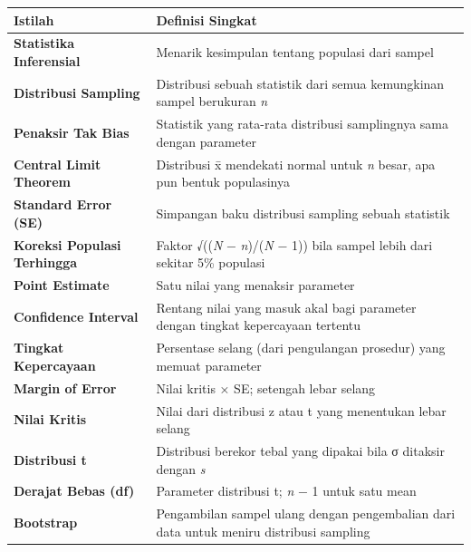 \documentclass[
  indonesian,
  letterpaper,
]{book}
\newcounter{none} %
\begin{document}
{\def\LTcaptype{none} %
\begin{longtable}[]{@{}
  >{\raggedright\arraybackslash}p{}
  >{\raggedright\arraybackslash}p{}@{}}
\toprule\noalign{}
\begin{minipage}[b]{\linewidth}\raggedright
Istilah
\end{minipage} & \begin{minipage}[b]{\linewidth}\raggedright
Definisi Singkat
\end{minipage} \\
\midrule\noalign{}
\endhead
\bottomrule\noalign{}
\endlastfoot
\textbf{Statistika Inferensial} & Menarik kesimpulan tentang populasi
dari sampel \\
\textbf{Distribusi Sampling} & Distribusi sebuah statistik dari semua
kemungkinan sampel berukuran \emph{n} \\
\textbf{Penaksir Tak Bias} & Statistik yang rata-rata distribusi
samplingnya sama dengan parameter \\
\textbf{Central Limit Theorem} & Distribusi x̄ mendekati normal untuk
\emph{n} besar, apa pun bentuk populasinya \\
\textbf{Standard Error (SE)} & Simpangan baku distribusi sampling sebuah
statistik \\
\textbf{Koreksi Populasi Terhingga} & Faktor √((\emph{N} −
\emph{n})/(\emph{N} − 1)) bila sampel lebih dari sekitar 5\% populasi \\
\textbf{Point Estimate} & Satu nilai yang menaksir parameter \\
\textbf{Confidence Interval} & Rentang nilai yang masuk akal bagi
parameter dengan tingkat kepercayaan tertentu \\
\textbf{Tingkat Kepercayaan} & Persentase selang (dari pengulangan
prosedur) yang memuat parameter \\
\textbf{Margin of Error} & Nilai kritis × SE; setengah lebar selang \\
\textbf{Nilai Kritis} & Nilai dari distribusi z atau t yang menentukan
lebar selang \\
\textbf{Distribusi t} & Distribusi berekor tebal yang dipakai bila σ
ditaksir dengan \emph{s} \\
\textbf{Derajat Bebas (df)} & Parameter distribusi t; \emph{n} − 1 untuk
satu mean \\
\textbf{Bootstrap} & Pengambilan sampel ulang dengan pengembalian dari
data untuk meniru distribusi sampling \\
\end{longtable}
}
\end{document}
